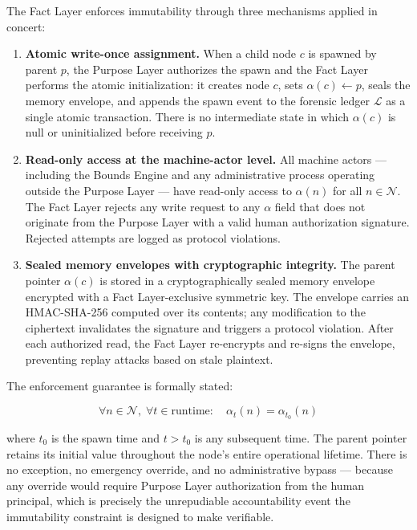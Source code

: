 The Fact Layer enforces immutability through three mechanisms applied in concert:

\begin{enumerate}
    \item[\textbf{F$_1$}] \textbf{Atomic write-once assignment.} When a child node $c$ is spawned by parent $p$, the Purpose Layer authorizes the spawn and the Fact Layer performs the atomic initialization: it creates node $c$, sets $\alpha(c) \leftarrow p$, seals the memory envelope, and appends the spawn event to the forensic ledger $\mathcal{L}$ as a single atomic transaction. There is no intermediate state in which $\alpha(c)$ is null or uninitialized before receiving $p$.

    \item[\textbf{F$_2$}] \textbf{Read-only access at the machine-actor level.} All machine actors — including the Bounds Engine and any administrative process operating outside the Purpose Layer — have read-only access to $\alpha(n)$ for all $n \in \mathcal{N}$. The Fact Layer rejects any write request to any $\alpha$ field that does not originate from the Purpose Layer with a valid human authorization signature. Rejected attempts are logged as protocol violations.

    \item[\textbf{F$_3$}] \textbf{Sealed memory envelopes with cryptographic integrity.} The parent pointer $\alpha(c)$ is stored in a cryptographically sealed memory envelope encrypted with a Fact Layer-exclusive symmetric key. The envelope carries an HMAC-SHA-256 computed over its contents; any modification to the ciphertext invalidates the signature and triggers a protocol violation. After each authorized read, the Fact Layer re-encrypts and re-signs the envelope, preventing replay attacks based on stale plaintext.
\end{enumerate}

The enforcement guarantee is formally stated:

\begin{equation}
\forall n \in \mathcal{N},\; \forall t \in \text{runtime}:\quad \alpha_t(n) = \alpha_{t_0}(n)
\tag{ENF-1}
\end{equation}

where $t_0$ is the spawn time and $t > t_0$ is any subsequent time. The parent pointer retains its initial value throughout the node's entire operational lifetime. There is no exception, no emergency override, and no administrative bypass — because any override would require Purpose Layer authorization from the human principal, which is precisely the unrepudiable accountability event the immutability constraint is designed to make verifiable.


